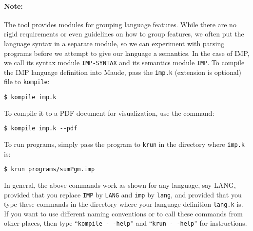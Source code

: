 \begin{latexComment}
\paragraph{Note:}{
The \K tool provides modules for grouping language features.  While
there are no rigid requirements or even guidelines on how to group
features, we often put the language syntax in a separate module, so we
can experiment with parsing programs before we attempt to give our
language a semantics.  In the case of IMP, we call its syntax module
\texttt{IMP-SYNTAX} and its semantics module \texttt{IMP}.  To compile
the IMP language definition into Maude, pass the \texttt{imp.k}
(extension is optional) file to \texttt{kompile}:
\begin{verbatim}
$ kompile imp.k
\end{verbatim}
To compile it to a PDF document for visualization, use the command:
\begin{verbatim}
$ kompile imp.k --pdf
\end{verbatim}
To run programs, simply pass the program to \texttt{krun} in the
directory where \texttt{imp.k} is:
\begin{verbatim}
$ krun programs/sumPgm.imp
\end{verbatim}
In general, the above commands work as shown for any language, say
LANG, provided that you replace \texttt{IMP} by \texttt{LANG} and
\texttt{imp} by \texttt{lang}, and provided that you type these
commands in the directory where your language definition
\texttt{lang.k} is.  If you want to use different naming
conventions or to call these commands from other places, then type
``\texttt{kompile -\,\!-help}'' and ``\texttt{krun -\,\!-help}'' for
instructions.
}

\end{latexComment}

\vspace*{3ex}
